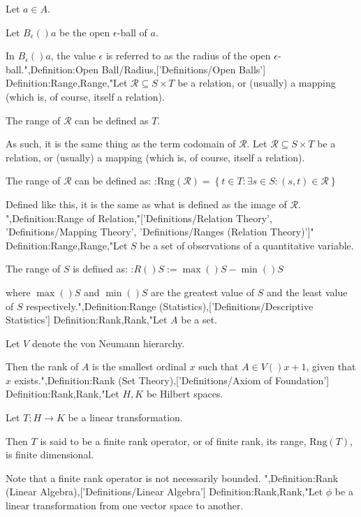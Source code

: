 Let $a \in A$.

Let $B_\epsilon \left(   \right)a$ be the open $\epsilon$-ball of $a$.


In $B_\epsilon \left(   \right)a$, the value $\epsilon$ is referred to as the radius of the open $\epsilon$-ball.",Definition:Open Ball/Radius,['Definitions/Open Balls']
Definition:Range,Range,"Let $\mathcal R \subseteq S \times T$ be a relation, or (usually) a mapping (which is, of course, itself a relation).


The range of $\mathcal R$ can be defined as $T$.

As such, it is the same thing as the term codomain of $\mathcal R$.
Let $\mathcal R \subseteq S \times T$ be a relation, or (usually) a mapping (which is, of course, itself a relation).


The range of $\mathcal R$ can be defined as:
:$\mathrm {Rng} \left( \mathcal R \right) = \left\lbrace t \in T: \exists s \in S: \left( s, t \right) \in \mathcal R \right\rbrace$

Defined like this, it is the same as what is defined as the image of $\mathcal R$.
",Definition:Range of Relation,"['Definitions/Relation Theory', 'Definitions/Mapping Theory', 'Definitions/Ranges (Relation Theory)']"
Definition:Range,Range,"Let $S$ be a set of observations of a quantitative variable.


The range of $S$ is defined as:
:$R \left(   \right)S := \max \left(   \right)S - \min \left(   \right)S$

where $\max \left(   \right)S$ and $\min \left(   \right)S$ are the greatest value of $S$ and the least value of $S$ respectively.",Definition:Range (Statistics),['Definitions/Descriptive Statistics']
Definition:Rank,Rank,"Let $A$ be a set.

Let $V$ denote the von Neumann hierarchy.


Then the rank of $A$ is the smallest ordinal $x$ such that $A \in V \left(   \right){x + 1}$, given that $x$ exists.",Definition:Rank (Set Theory),['Definitions/Axiom of Foundation']
Definition:Rank,Rank,"Let $H, K$ be Hilbert spaces.

Let $T: H \to K$ be a linear transformation.


Then $T$ is said to be a finite rank operator, or of finite rank,  its range, $\mathrm {Rng} \left( T \right)$, is finite dimensional.

Note that a finite rank operator is not necessarily bounded.
",Definition:Rank (Linear Algebra),['Definitions/Linear Algebra']
Definition:Rank,Rank,"Let $\phi$ be a linear transformation from one vector space to another.

